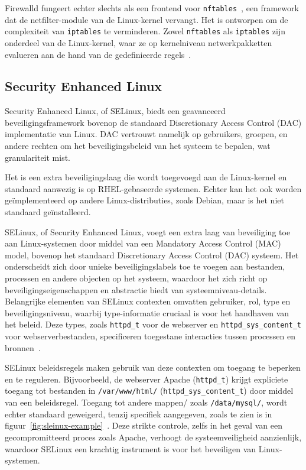Firewalld fungeert echter slechts als een frontend voor \texttt{nftables}~\autocite{dakic2022linux}, een framework dat de netfilter-module van de Linux-kernel vervangt.
Het is ontworpen om de complexiteit van \texttt{iptables} te verminderen.
Zowel \texttt{nftables} als \texttt{iptables} zijn onderdeel van de Linux-kernel, waar ze op kernelniveau netwerkpakketten evalueren aan de hand van de gedefinieerde regels~\autocite{ward2021linux}.

\subsection{Security Enhanced Linux}
\label{linux_selinux}

Security Enhanced Linux, of SELinux, biedt een geavanceerd beveiligingsframework bovenop de standaard Discretionary Access Control (DAC) implementatie van Linux.
DAC vertrouwt namelijk op gebruikers, groepen, en andere rechten om het beveiligingsbeleid van het systeem te bepalen, wat granulariteit mist.

Het is een extra beveiligingslaag die wordt toegevoegd aan de Linux-kernel en standaard aanwezig is op RHEL-gebaseerde systemen.
Echter kan het ook worden ge\"implementeerd op andere Linux-distributies, zoals Debian, maar is het niet standaard ge\"installeerd.

SELinux, of Security Enhanced Linux, voegt een extra laag van beveiliging toe aan Linux-systemen door middel van een Mandatory Access Control (MAC) model, bovenop het standaard Discretionary Access Control (DAC) systeem.
Het onderscheidt zich door unieke beveiligingslabels toe te voegen aan bestanden, processen en andere objecten op het systeem, waardoor het zich richt op beveiligingseigenschappen en abstractie biedt van systeemniveau-details.
Belangrijke elementen van SELinux contexten omvatten gebruiker, rol, type en beveiligingsniveau, waarbij type-informatie cruciaal is voor het handhaven van het beleid.
Deze types, zoals \texttt{httpd\_t} voor de webserver en \texttt{httpd\_sys\_content\_t} voor webserverbestanden, specificeren toegestane interacties tussen processen en bronnen~\autocite{selinux-rhel8}.

SELinux beleidsregels maken gebruik van deze contexten om toegang te beperken en te reguleren.
Bijvoorbeeld, de webserver Apache (\texttt{httpd\_t}) krijgt expliciete toegang tot bestanden in \texttt{/var/www/html/} (\texttt{httpd\_sys\_content\_t}) door middel van een beleidsregel.
Toegang tot andere mappen/ zoals \texttt{/data/mysql/}, wordt echter standaard geweigerd, tenzij specifiek aangegeven, zoals te zien is in figuur~\ref{fig:sleinux-example}~\autocite{selinux-rhel8}.
Deze strikte controle, zelfs in het geval van een gecompromitteerd proces zoals Apache, verhoogt de systeemveiligheid aanzienlijk, waardoor SELinux een krachtig instrument is voor het beveiligen van Linux-systemen.

